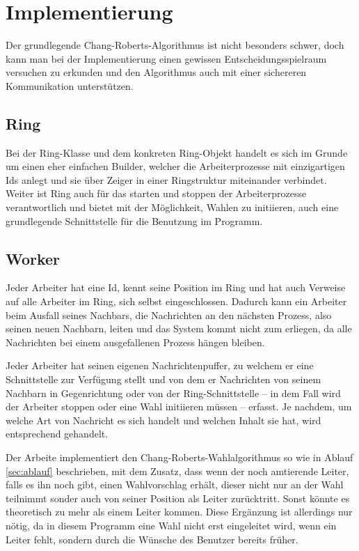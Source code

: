 \section{Implementierung}

Der grundlegende Chang-Roberts-Algorithmus ist nicht besonders schwer, doch kann man bei der Implementierung einen gewissen Entscheidungsspielraum versuchen
zu erkunden und den Algorithmus auch mit einer sichereren Kommunikation unterstützen.


\subsection{Ring}

Bei der Ring-Klasse und dem konkreten Ring-Objekt handelt es sich im Grunde um einen eher einfachen Builder, welcher die Arbeiterprozesse mit einzigartigen 
Ids anlegt und sie über Zeiger in einer Ringstruktur miteinander verbindet. Weiter ist Ring auch für das starten und stoppen der Arbeiterprozesse 
verantwortlich und bietet mit der Möglichkeit, Wahlen zu initiieren, auch eine grundlegende Schnittstelle für die Benutzung im Programm.


\subsection{Worker}

Jeder Arbeiter hat eine Id, kennt seine Position im Ring und hat auch Verweise auf alle Arbeiter im Ring, sich selbst eingeschlossen.
Dadurch kann ein Arbeiter beim Ausfall seines Nachbars, die Nachrichten an den nächsten Prozess, also seinen neuen Nachbarn, leiten und das System kommt
nicht zum erliegen, da alle Nachrichten bei einem ausgefallenen Prozess hängen bleiben.

Jeder Arbeiter hat seinen eigenen Nachrichtenpuffer, zu welchem er eine Schnittstelle zur Verfügung stellt und von dem er Nachrichten von seinem Nachbarn in 
Gegenrichtung oder von der Ring-Schnittstelle -- in dem Fall wird der Arbeiter stoppen oder eine Wahl initiieren müssen -- erfasst. Je nachdem, um welche
Art von Nachricht es sich handelt und welchen Inhalt sie hat, wird entsprechend gehandelt.

Der Arbeite implementiert den Chang-Roberts-Wahlalgorithmus so wie in Ablauf \ref{sec:ablauf} beschrieben, mit dem Zusatz, dass wenn der noch amtierende
Leiter, falls es ihn noch gibt, einen Wahlvorschlag erhält, dieser nicht nur an der Wahl teilnimmt sonder auch von seiner Position als Leiter zurücktritt.
Sonst könnte es theoretisch zu mehr als einem Leiter kommen. Diese Ergänzung ist allerdings nur nötig, da in diesem Programm eine Wahl nicht erst
eingeleitet wird, wenn ein Leiter fehlt, sondern durch die Wünsche des Benutzer bereits früher.

